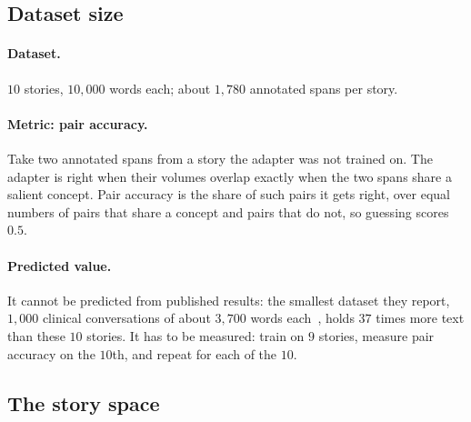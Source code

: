 \documentclass[11pt]{article}
\theoremstyle{remark}
\begin{document}
\subsection{Dataset size}\label{sec:dataset-size}

\paragraph{Dataset.} $10$ stories, $10{,}000$ words each; about $1{,}780$ annotated spans per story.

\paragraph{Metric: pair accuracy.} Take two annotated spans from a story the adapter was not trained on. The adapter is right when their volumes overlap exactly when the two spans share a salient concept. Pair accuracy is the share of such pairs it gets right, over equal numbers of pairs that share a concept and pairs that do not, so guessing scores $0.5$.

\paragraph{Predicted value.} It cannot be predicted from published results: the smallest dataset they report, $1{,}000$ clinical conversations of about $3{,}700$ words each~\cite{baseten}, holds $37$ times more text than these $10$ stories. It has to be measured: train on $9$ stories, measure pair accuracy on the $10$th, and repeat for each of the $10$.

\FloatBarrier
\subsection{The story space}\label{sec:space}
\end{document}
